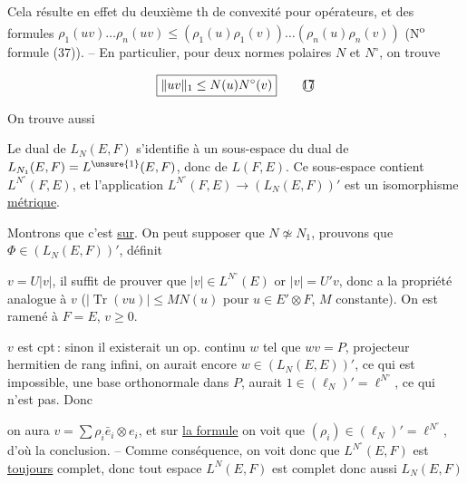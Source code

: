 
Cela résulte en effet  du deuxième th de convexité pour opérateurs, et des formules $\rho_1(uv)\ldots\rho_n(uv)\leq(\rho_1(u)\rho_1(v))\ldots(\rho_n(u)\rho_n(v))$ (N\textsuperscript{o} \unsure{,} formule (37)). -- En particulier,  pour  deux normes polaires $N$ et $N^\circ$, on trouve


\[
\boxed{\lVert uv\rVert_1\leq N(u)N^\circ(v)}\tag*{\textcircled{17}}
\]

On trouve aussi  

Le dual de $L_N(E,F)$ s'identifie à un sous-espace du dual de $L_{N_1}(E,F)=L^{\unsure{1}}(E,F)$, donc de $L(F,E)$. Ce sous-espace contient $L^{N^\circ}(F,E)$, et l'application $L^{N^\circ}(F,E)\to(L_N(E,F))'$ est un isomorphisme \uline{métrique}.

Montrons que c'est \uline{sur}. On peut supposer que $N\not\simeq N_1$, prouvons que   $\Phi\in(L_N(E,F))'$, définit  

$v=U|v|$, il suffit de prouver que $|v|\in L^{N^\circ}(E)$ or $|v|=U'v$, donc a la  propriété analogue à $v$ ($|\operatorname{Tr}(vu)|\leq M N(u)$ pour $u\in E'\otimes F$, $M$ constante). On est ramené à $F=E$, $v\geq 0$.

$v$ est cpt\,: sinon il existerait un op. continu $w$ tel que  $wv=P$, projecteur hermitien de rang infini,  on aurait encore $w\in(L_N(E,E))'$, ce qui est impossible,   une base orthonormale dans $P$,  aurait  $1\in(\ell_N)'=\ell^{N^\circ}$, ce qui n'est pas. Donc

on aura $v=\sum\rho_i\bar e_i\otimes e_i$, et sur \uline{la  formule} on voit que $(\rho_i)\in(\ell_N)'=\ell^{N^\circ}$, d'où la conclusion. -- Comme conséquence, on voit donc que $L^{N^\circ}(E,F)$ est \uline{toujours} complet, donc tout espace $L^N(E,F)$ est complet donc aussi $L_N(E,F)$

